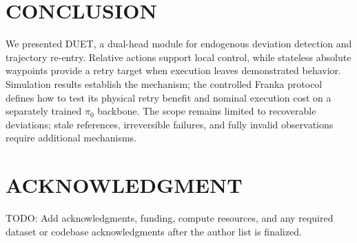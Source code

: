 \documentclass[letterpaper, 10 pt, conference]{ieeeconf}
\begin{document}
\section{CONCLUSION}

We presented DUET, a dual-head module for endogenous deviation detection and trajectory re-entry. Relative actions support local control, while stateless absolute waypoints provide a retry target when execution leaves demonstrated behavior. Simulation results establish the mechanism; the controlled Franka protocol defines how to test its physical retry benefit and nominal execution cost on a separately trained $\pi_0$ backbone. The scope remains limited to recoverable deviations; stale references, irreversible failures, and fully invalid observations require additional mechanisms.

\section*{ACKNOWLEDGMENT}

TODO: Add acknowledgments, funding, compute resources, and any required dataset or codebase acknowledgments after the author list is finalized.



\end{document}
